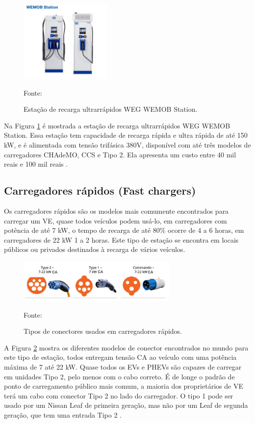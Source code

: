 \begin{figure}[H]
    \centering
    \includegraphics[width=0.4\textwidth]{./Figuras/estacao_ultra_rapida.png}
    \caption{Estação de recarga ultrarrápidos WEG WEMOB Station.}{Fonte: \cite{weg_estacao}}
   \label{fig:estacao_ultra_rapida}
\end{figure}

Na Figura \ref{fig:estacao_ultra_rapida} é mostrada a estação de recarga ultrarrápidos WEG WEMOB Station. Essa estação tem capacidade de recarga rápida e ultra rápida de até 150 kW, e é alimentada com tensão trifásica 380V, disponível com até três modelos de carregadores CHAdeMO, CCS e Tipo 2. Ela apresenta um custo entre 40 mil reais e 100 mil reais \cite{weg_estacao}.

\subsection{Carregadores rápidos (Fast chargers)}

Os carregadores rápidos são os modelos mais comumente encontrados para carregar um VE, quase todos veículos podem usá-lo, em carregadores com potência de até 7 kW, o tempo de recarga de até 80\% ocorre de 4 a 6 horas, em carregadores de 22 kW 1 a 2 horas. Este tipo de estação se encontra em locais públicos ou privados destinados à recarga de vários veículos.

\begin{figure}[H]
    \centering
    \includegraphics[width=0.7\textwidth]{./Figuras/fast_chargers.png}
    \caption{Tipos de conectores usados em carregadores rápidos.}{Fonte: \cite{ev_conect_zap}}
   \label{fig:fast_chargers}
\end{figure}

A Figura \ref{fig:fast_chargers} mostra os diferentes modelos de conector encontrados no mundo para este tipo de estação, todos entregam tensão CA ao veículo com uma potência máxima de 7 até 22 kW. Quase todos os EVs e PHEVs são capazes de carregar em unidades Tipo 2, pelo menos com o cabo correto. É de longe o padrão de ponto de carregamento público mais comum, a maioria dos proprietários de VE terá um cabo com conector Tipo 2 no lado do carregador. O tipo 1 pode ser usado por um Nissan Leaf de primeira geração, mas não por um Leaf de segunda geração, que tem uma entrada Tipo 2 \cite{ev_conect_zap}.

